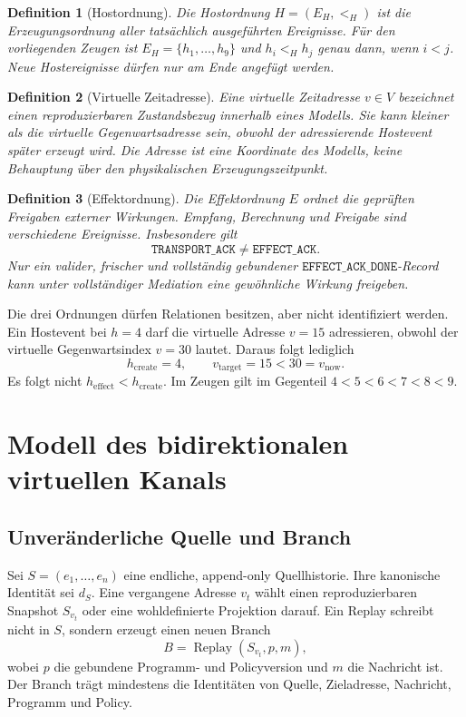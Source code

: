 \documentclass[11pt,a4paper]{article}
\newtheorem{definition}{Definition}[section]
\theoremstyle{remark}
\newcommand{\DONE}{\texttt{EFFECT\_ACK\_DONE}}
\begin{document}
\begin{definition}[Hostordnung]
Die \emph{Hostordnung} \(H=(E_H,<_{H})\) ist die Erzeugungsordnung aller
tatsächlich ausgeführten Ereignisse. Für den vorliegenden Zeugen ist
\(E_H=\{h_1,\ldots,h_9\}\) und \(h_i<_{H}h_j\) genau dann, wenn \(i<j\).
Neue Hostereignisse dürfen nur am Ende angefügt werden.
\end{definition}

\begin{definition}[Virtuelle Zeitadresse]
Eine \emph{virtuelle Zeitadresse} \(v\in V\) bezeichnet einen
reproduzierbaren Zustandsbezug innerhalb eines Modells. Sie kann kleiner als
die virtuelle Gegenwartsadresse sein, obwohl der adressierende Hostevent
später erzeugt wird. Die Adresse ist eine Koordinate des Modells, keine
Behauptung über den physikalischen Erzeugungszeitpunkt.
\end{definition}

\begin{definition}[Effektordnung]
Die \emph{Effektordnung} \(E\) ordnet die geprüften Freigaben externer
Wirkungen. Empfang, Berechnung und Freigabe sind verschiedene Ereignisse.
Insbesondere gilt
\[
 \texttt{TRANSPORT\_ACK}\neq\texttt{EFFECT\_ACK}.
\]
Nur ein valider, frischer und vollständig gebundener \(\DONE\)-Record kann
unter vollständiger Mediation eine gewöhnliche Wirkung freigeben.
\end{definition}

Die drei Ordnungen dürfen Relationen besitzen, aber nicht identifiziert
werden. Ein Hostevent bei \(h=4\) darf die virtuelle Adresse \(v=15\)
adressieren, obwohl der virtuelle Gegenwartsindex \(v=30\) lautet. Daraus
folgt lediglich
\[
 h_{\mathrm{create}}=4,
 \qquad
 v_{\mathrm{target}}=15<30=v_{\mathrm{now}}.
\]
Es folgt nicht \(h_{\mathrm{effect}}<h_{\mathrm{create}}\). Im Zeugen gilt
im Gegenteil \(4<5<6<7<8<9\).

\section{Modell des bidirektionalen virtuellen Kanals}

\subsection{Unveränderliche Quelle und Branch}

Sei \(S=(e_1,\ldots,e_n)\) eine endliche, append-only Quellhistorie. Ihre
kanonische Identität sei \(d_S\). Eine vergangene Adresse \(v_t\) wählt einen
reproduzierbaren Snapshot \(S_{v_t}\) oder eine wohldefinierte Projektion
darauf. Ein Replay schreibt nicht in \(S\), sondern erzeugt einen neuen
Branch
\[
 B=\operatorname{Replay}(S_{v_t},p,m),
\]
wobei \(p\) die gebundene Programm- und Policyversion und \(m\) die
Nachricht ist. Der Branch trägt mindestens die Identitäten von Quelle,
Zieladresse, Nachricht, Programm und Policy.
\end{document}
